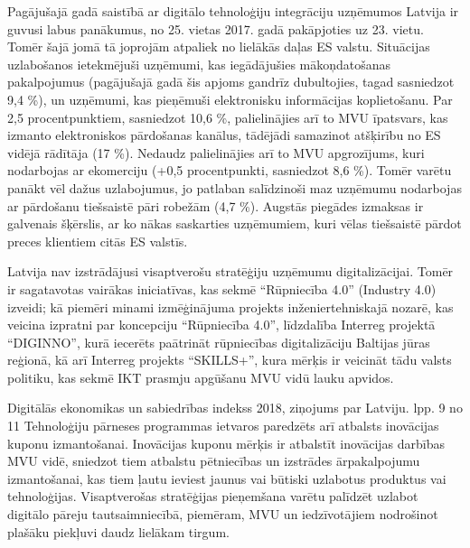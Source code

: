 Pagājušajā gadā saistībā ar digitālo tehnoloģiju integrāciju uzņēmumos Latvija ir guvusi
labus panākumus, no 25. vietas 2017. gadā pakāpjoties uz 23. vietu. Tomēr šajā jomā tā
joprojām atpaliek no lielākās daļas ES valstu. Situācijas uzlabošanos ietekmējuši uzņēmumi,
kas iegādājušies mākoņdatošanas pakalpojumus (pagājušajā gadā šis apjoms gandrīz
dubultojies, tagad sasniedzot 9,4 \%), un uzņēmumi, kas pieņēmuši elektronisku informācijas
koplietošanu. Par 2,5 procentpunktiem, sasniedzot 10,6 \%, palielinājies arī to MVU īpatsvars,
kas izmanto elektroniskos pārdošanas kanālus, tādējādi samazinot atšķirību no ES vidējā
rādītāja (17 \%). Nedaudz palielinājies arī to MVU apgrozījums, kuri nodarbojas ar ekomerciju 
(+0,5 procentpunkti, sasniedzot 8,6 \%). Tomēr varētu panākt vēl dažus
uzlabojumus, jo patlaban salīdzinoši maz uzņēmumu nodarbojas ar pārdošanu tiešsaistē pāri
robežām (4,7 \%). Augstās piegādes izmaksas ir galvenais šķērslis, ar ko nākas saskarties
uzņēmumiem, kuri vēlas tiešsaistē pārdot preces klientiem citās ES valstīs.
\par
Latvija nav izstrādājusi visaptverošu stratēģiju uzņēmumu digitalizācijai. Tomēr ir
sagatavotas vairākas iniciatīvas, kas sekmē “Rūpniecība 4.0” (Industry 4.0) izveidi; kā
piemēri minami izmēģinājuma projekts inženiertehniskajā nozarē, kas veicina izpratni par
koncepciju “Rūpniecība 4.0”, līdzdalība Interreg projektā “DIGINNO”, kurā iecerēts paātrināt
rūpniecības digitalizāciju Baltijas jūras reģionā, kā arī Interreg projekts “SKILLS+”, kura
mērķis ir veicināt tādu valsts politiku, kas sekmē IKT prasmju apgūšanu MVU vidū lauku
apvidos.
\par
Digitālās ekonomikas un sabiedrības indekss 2018, ziņojums par Latviju. lpp. 9 no 11
Tehnoloģiju pārneses programmas ietvaros paredzēts arī atbalsts inovācijas kuponu
izmantošanai. Inovācijas kuponu mērķis ir atbalstīt inovācijas darbības MVU vidē, sniedzot
tiem atbalstu pētniecības un izstrādes ārpakalpojumu izmantošanai, kas tiem ļautu ieviest
jaunus vai būtiski uzlabotus produktus vai tehnoloģijas.
Visaptverošas stratēģijas pieņemšana varētu palīdzēt uzlabot digitālo pāreju
tautsaimniecībā, piemēram, MVU un iedzīvotājiem nodrošinot plašāku piekļuvi daudz
lielākam tirgum.